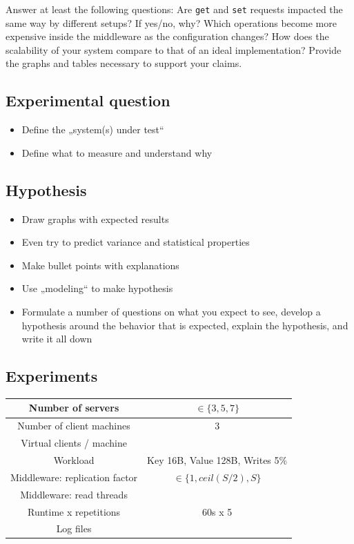 \documentclass[11pt]{article}
\newcommand{\todo}[1]{\fcolorbox{black}{Apricot}{TODO: #1}}
\begin{document}
Answer at least the following questions: Are \texttt{get} and \texttt{set} requests impacted the same way by different setups? If yes/no, why? Which operations become more expensive inside the middleware as the configuration changes? How does the scalability of your system compare to that of an ideal implementation? Provide the graphs and tables necessary to support your claims.


\subsection{Experimental question}
\begin{itemize}
\item Define the „system(s) under test“
\item Define what to measure and understand why
\end{itemize}

\subsection{Hypothesis}
\begin{itemize}
\item Draw graphs with expected results
\item Even try to predict variance and statistical properties
\item Make bullet points with explanations
\item Use „modeling“ to make hypothesis
\item Formulate a number of questions on what you expect to see, develop a hypothesis around the behavior that is expected, explain the hypothesis, and write it all down
\end{itemize}

\subsection{Experiments}
\begin{center}
\small{
\smallskip
\begin{tabular}{|c|c|}
\hline Number of servers & $\in \{3, 5, 7\}$ \\ 
\hline Number of client machines & 3 \\ 
\hline Virtual clients / machine & \todo{} \\ 
\hline Workload & Key 16B, Value 128B, Writes 5\% \todo{} \\
\hline Middleware: replication factor & $\in \{1, ceil(S/2), S\}$ \\ 
\hline Middleware: read threads & \todo{} \\ 
\hline Runtime x repetitions & 60s x 5 \todo{} \\ 
\hline Log files & \todo{} \\
\hline 
\end{tabular} }
\end{center}
\end{document}
